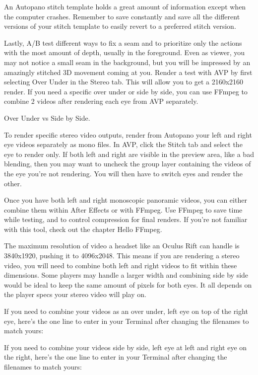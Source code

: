 \begin{fullwidth}
An Autopano stitch template holds a great amount of information except when the computer crashes.  Remember to save constantly and save all the different versions of your stitch template to easily revert to a preferred stitch version. 
\clearpage


Lastly, A/B test different ways to fix a seam and to prioritize only the actions with the most amount of depth, usually in the foreground. Even as viewer, you may not notice a small seam in the background, but you will be impressed by an amazingly stitched 3D movement coming at you. Render a test with AVP by first selecting Over Under in the Stereo tab. This will allow you to get a 2160x2160 render. If you need a specific over under or side by side, you can use FFmpeg to combine 2 videos after rendering each eye from AVP separately.

\clearpage
{\large Over Under vs Side by Side. \par}

To render specific stereo video outputs, render from Autopano your left and right eye videos separately as mono files. In AVP, click the Stitch tab and select the eye to render only. If both left and right are visible in the preview area, like a bad blending, then you may want to uncheck the group layer containing the videos of the eye you’re not rendering. You will then have to switch eyes and render the other.

Once you have both left and right monoscopic panoramic videos, you can either combine them within After Effects or with FFmpeg. Use FFmpeg to save time while testing, and to control compression for final renders. If you’re not familiar with this tool, check out the chapter Hello FFmpeg. 

The maximum resolution of video a headset like an Oculus Rift can handle is 3840x1920, pushing it to 4096x2048. This means if you are rendering a stereo video, you will need to combine both left and right videos to fit within these dimensions. Some players may handle a larger width and combining side by side would be ideal to keep the same amount of pixels for both eyes. It all depends on the player specs your stereo video will play on. 

If you need to combine your videos as an over under, left eye on top of the right eye, here’s the one line to enter in your Terminal after changing the filenames to match yours:


If you need to combine your videos side by side, left eye at left and right eye on the right, here’s the one line to enter in your Terminal after changing the filenames to match yours:




\clearpage
\end{fullwidth}
